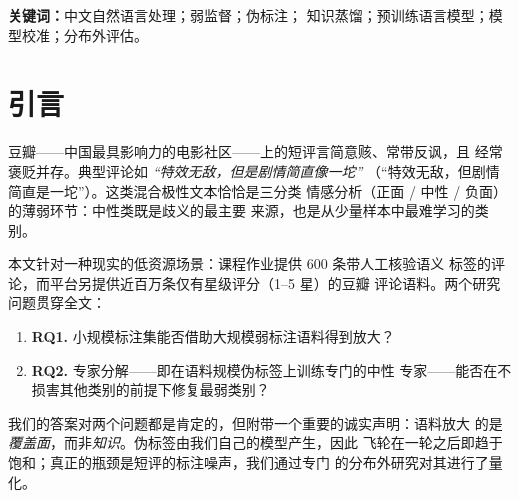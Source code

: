 \documentclass[11pt,a4paper]{article}
\begin{document}
\vspace{0.6em}
{\small\noindent\textbf{关键词：}中文自然语言处理；弱监督；伪标注；
知识蒸馏；预训练语言模型；模型校准；分布外评估。}

\newpage
\tableofcontents
\newpage

\section{引言}
\label{sec:intro}

豆瓣——中国最具影响力的电影社区——上的短评言简意赅、常带反讽，且
经常褒贬并存。典型评论如 \emph{``特效无敌，但是剧情简直像一坨''}
（``特效无敌，但剧情简直是一坨''）。这类混合极性文本恰恰是三分类
情感分析（正面 / 中性 / 负面）的薄弱环节：中性类既是歧义的最主要
来源，也是从少量样本中最难学习的类别。

本文针对一种现实的低资源场景：课程作业提供 600 条带人工核验语义
标签的评论，而平台另提供近百万条仅有星级评分（1--5 星）的豆瓣
评论语料。两个研究问题贯穿全文：

\begin{enumerate}
  \item \textbf{RQ1.} 小规模标注集能否借助大规模弱标注语料得到放大？
  \item \textbf{RQ2.} 专家分解——即在语料规模伪标签上训练专门的中性
        专家——能否在不损害其他类别的前提下修复最弱类别？
\end{enumerate}

我们的答案对两个问题都是肯定的，但附带一个重要的诚实声明：语料放大
的是\emph{覆盖面}，而非\emph{知识}。伪标签由我们自己的模型产生，因此
飞轮在一轮之后即趋于饱和；真正的瓶颈是短评的标注噪声，我们通过专门
的分布外研究对其进行了量化。
\end{document}
